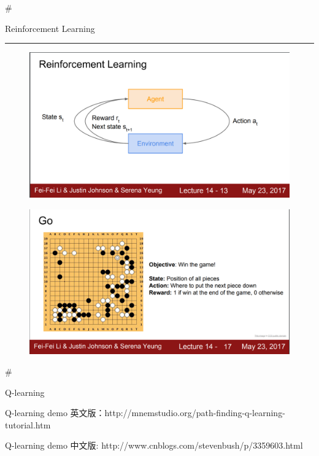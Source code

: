 \documentclass[11pt]{article}
\makeatletter
\def\maxwidth{\ifdim\Gin@nat@width>\linewidth\linewidth
    \else\Gin@nat@width\fi}
\let\Oldincludegraphics\includegraphics
\renewcommand{\includegraphics}[1]{\Oldincludegraphics[width=.8\maxwidth]{#1}}
\makeatother
\begin{document}
    \#

Reinforcement Learning

\begin{center}\rule{0.5\linewidth}{\linethickness}\end{center}

\begin{figure}
\centering
\includegraphics{reinforcement.png}
\caption{}
\end{figure}

    \begin{figure}
\centering
\includegraphics{alphago.png}
\caption{}
\end{figure}

    \#

Q-learning

Q-learning demo
英文版：http://mnemstudio.org/path-finding-q-learning-tutorial.htm

Q-learning demo 中文版: http://www.cnblogs.com/stevenbush/p/3359603.html
\end{document}
